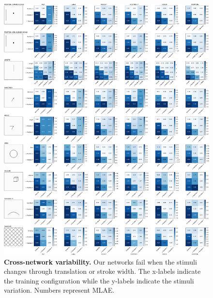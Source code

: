 \documentclass[journal]{vgtc}        %
\begin{document}
\begin{figure}[tbhp]
	\centering
	  \includegraphics[width=\linewidth]{cross_network_new.pdf}
  \caption{\textbf{Cross-network variability.} Our networks fail when the stimuli changes through translation or stroke width. The x-labels indicate the training configuration while the y-labels indicate the stimuli variation. Numbers represent MLAE.}
	\label{fig:cross_network}
\end{figure}
\end{document}
